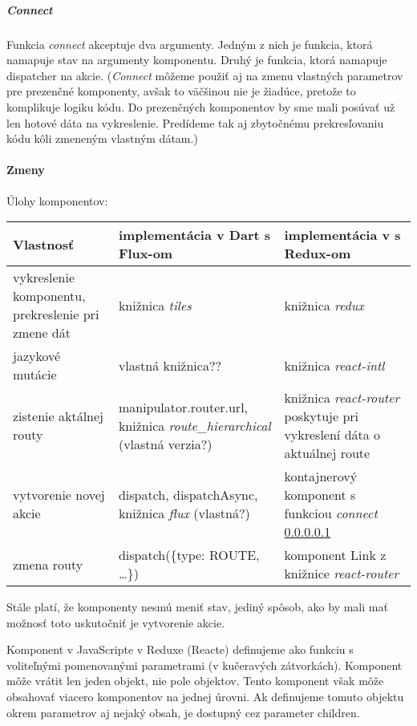 \subparagraph{Connect}
\label{func:connect}
Funkcia \emph{connect} akceptuje dva argumenty. Jedným z nich je funkcia, ktorá namapuje stav na argumenty komponentu. Druhý je funkcia, ktorá namapuje dispatcher na akcie. %
(\emph{Connect} môžeme použiť aj na zmenu vlastných parametrov pre prezenčné komponenty, avšak to väčšinou nie je žiadúce, pretože to komplikuje logiku kódu. Do prezenčných komponentov by sme mali posúvať už len hotové dáta na vykreslenie. Predídeme tak aj zbytočnému prekresľovaniu kódu kôli zmeneným vlastným dátam.)

\paragraph{Zmeny}
\NEW{}
Úlohy komponentov:\\
\begin{tabular}{| p{4cm} | p{5cm} | p{5cm} |}
 \hline
   Vlastnosť & implementácia v Dart s Flux-om & implementácia v \JS{} s Redux-om \\
  \hline
  \hline
   vykreslenie komponentu, prekreslenie pri zmene dát & 
   knižnica \emph{tiles} &
   knižnica \emph{redux} \\
  \hline
   jazykové mutácie & 
   vlastná knižnica?? \TODO{} & 
   knižnica \emph{react-intl} \\
  \hline
   zistenie aktálnej routy & 
   manipulator.router.url, knižnica \emph{route\_hierarchical} (vlastná verzia?) \TODO{} & 
   knižnica \emph{react-router} poskytuje pri vykreslení dáta o aktuálnej route \\
  \hline
   vytvorenie novej akcie & 
   dispatch, dispatchAsync, knižnica \emph{flux} (vlastná?) \TODO{} & 
   kontajnerový komponent s funkciou \emph{connect} \ref{func:connect} \\
  \hline
   zmena routy & 
   dispatch(\{type: ROUTE, \ldots\}) & 
   komponent Link z knižnice \emph{react-router} \\
  \hline
 \end{tabular}

%

Stále platí, že komponenty nesmú meniť stav, jediný spôsob, ako by mali mať možnosť toto uskutočniť je vytvorenie akcie.

Komponent v JavaScripte v Reduxe (Reacte) %
definujeme ako funkciu s voliteľnými pomenovanými parametrami (v kučeravých zátvorkách). %
Komponent môže vrátit len jeden objekt, nie pole objektov. Tento komponent však môže obsahovať viacero komponentov na jednej úrovni.
Ak definujeme tomuto objektu okrem parametrov aj nejaký obsah, je dostupný cez parameter children.%

